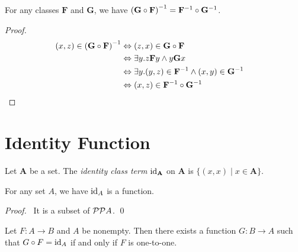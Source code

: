 \begin{theorem}[Pairing]
    For any classes $\mathbf{F}$ and $\mathbf{G}$, we have
    ${(\mathbf{G} \circ \mathbf{F})}^{-1} = {\mathbf{F}}^{-1} \circ {\mathbf{G}}^{-1}$.
\end{theorem}

\begin{proof}
    \pf
    \begin{align*}
        (x,z) \in {(\mathbf{G} \circ \mathbf{F})}^{-1} & \Leftrightarrow (z,x) \in \mathbf{G} \circ \mathbf{F} \\
        & \Leftrightarrow \exists y. z\mathbf{F}y \wedge y\mathbf{G}x \\
        & \Leftrightarrow \exists y. (y,z) \in {\mathbf{F}}^{-1} \wedge (x,y) \in {\mathbf{G}}^{-1} \\
        & \Leftrightarrow (x,z) \in {\mathbf{F}}^{-1} \circ {\mathbf{G}}^{-1} & \relax
    \end{align*}
\end{proof}

\section{Identity Function}

\begin{definition}
    Let $\mathbf{A}$ be a set. The \emph{identity class term} $\mathrm{id}_{\mathbf{A}}$ on $\mathbf{A}$ is
    $\{ (x,x) \mid x \in \mathbf{A} \}$.
\end{definition}

\begin{theorem}
    For any set $A$, we have $\mathrm{id}_{A}$ is a function.
\end{theorem}

\begin{proof}
    \pf\ It is a subset of $\mathcal{P} \mathcal{P} A$. \qed
\end{proof}

\begin{theorem}
    Let $F : A \rightarrow B$ and $A$ be nonempty. Then there exists a function
    $G : B \rightarrow A$ such that $G \circ F = \mathrm{id}_{A}$ if and only if $F$
    is one-to-one.
\end{theorem}


